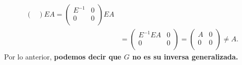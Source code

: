 \documentclass[11pt,letterpaper]{article}
\begin{document}
\begin{enumerate}
\begin{align*}
\begin{pmatrix}
\end{pmatrix}EA=\begin{pmatrix}
E^{-1} & 0\\
0 & 0\\
\end{pmatrix}EA\\
&=\begin{pmatrix}
E^{-1}EA & 0\\
0 & 0\\
\end{pmatrix}= \begin{pmatrix}
A& 0\\
0 & 0\\
\end{pmatrix} \neq A.
\end{align*}
Por lo anterior, \textbf{podemos decir que $G$ no es su inversa generalizada.} 


\end{enumerate}
\end{document}
